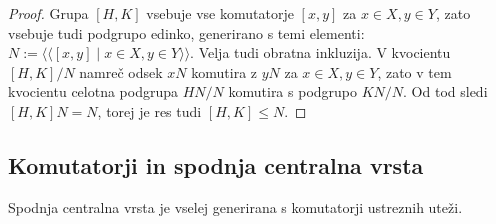 \documentclass[11pt]{book}
\renewcommand{\llangle}{\langle\langle}
\renewcommand{\rrangle}{\rangle\rangle}
\def\literatura{\color{modra}}
\def\vaje{{\literatura (glej vaje)}}
\def\kljuka{$\checkmark$}
\theoremstyle{definition}
\theoremstyle{zgled}
\theoremstyle{odprtproblem}
\theoremstyle{domacanaloga}
\newenvironment{dokaz}
    {\color{siva}\begin{proof}}
    {\end{proof}}
\theoremstyle{izrek}
\newtheorem*{lema}{Lema}
\newtheorem*{posledica}{Posledica}
\begin{document}
\begin{dokaz}
Grupa $[H,K]$ vsebuje vse komutatorje $[x,y]$ za $x \in X, y \in Y$, zato vsebuje tudi podgrupo edinko, generirano s temi elementi: $N := \llangle [x,y] \mid x \in X, y \in Y \rrangle$. Velja tudi obratna inkluzija. V kvocientu $[H,K]/N$ namreč odsek $xN$ komutira z $yN$ za $x \in X, y \in Y$, zato v tem kvocientu celotna podgrupa $HN/N$ komutira s podgrupo $KN/N$. Od tod sledi $[H,K]N = N$, torej je res tudi $[H,K] \leq N$.
\end{dokaz}



\subsection{Komutatorji in spodnja centralna vrsta}



Spodnja centralna vrsta je vselej generirana s komutatorji ustreznih uteži.
\end{document}

